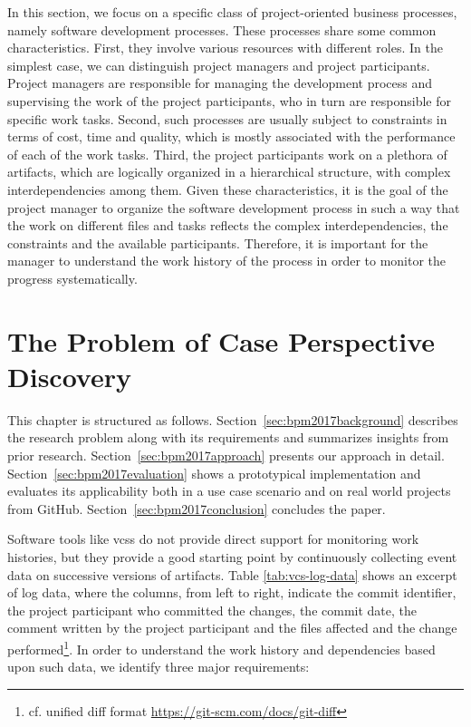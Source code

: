 	
	In this section, we focus on a specific class of project-oriented business processes,
	namely software development processes. These processes share some common
	characteristics. First, they involve various resources with different roles. In the
	simplest case, we can distinguish project managers and project participants.
	Project managers are responsible for managing the development process and
	supervising the work of the project participants, who in turn are responsible for
	specific work tasks. Second, such processes are usually subject to constraints in
	terms of cost, time and quality, which is mostly associated with the performance
	of each of the work tasks. Third, the project participants work on a plethora of
	artifacts, which are logically organized in a hierarchical structure, with complex
	interdependencies among them. Given these characteristics, it is the goal of the project manager to organize the software development process in such a way
	that the work on different files and tasks reflects the complex interdependencies,
	the constraints and the available participants. Therefore, it is important for the
	manager to understand the work history of the process in order to monitor the
	progress systematically.


\section{The Problem of Case Perspective Discovery}




This chapter is structured as follows. Section~\ref{sec:bpm2017background} describes the research problem along with its requirements and summarizes insights from prior research. Section~\ref{sec:bpm2017approach} presents our approach in detail. Section~\ref{sec:bpm2017evaluation} shows a prototypical implementation and evaluates its applicability both in a use case scenario and on real world projects from GitHub. Section~\ref{sec:bpm2017conclusion} concludes the paper.

Software tools like \glspl{vcs} do not provide direct support for monitoring work histories, but they provide a good starting point by continuously collecting event data on successive versions of artifacts.
Table \ref{tab:vcs-log-data} shows an excerpt of log data, where the columns, from left to right, indicate the commit identifier, the project participant who committed the changes, the commit date, the comment written by the project participant and the files affected and the change performed\footnote{cf. unified diff format  \url{https://git-scm.com/docs/git-diff}}. In order to understand the work history and dependencies based upon such data, we identify three major requirements:

